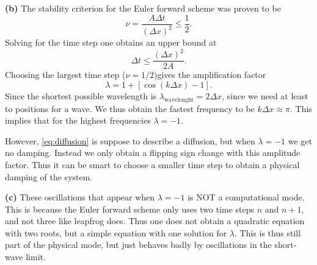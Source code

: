 \textbf{(b)}
The stability criterion for the Euler forward scheme was proven to be 
\begin{equation*}
    \nu = \frac{A \Delta t}{(\Delta x)^2} \le \frac{1}{2}.
\end{equation*}
Solving for the time step one obtains an upper bound at
\begin{equation*}
    \Delta t \leq \frac{(\Delta x)^2}{2A}.
\end{equation*}
Choosing the largest time step ($\nu=1/2$)gives the amplification factor 
\begin{equation*}
    \lambda = 1 + \left[\cos(k\Delta x) - 1\right].
\end{equation*}
Since the shortest possible wavelength is $\lambda_\text{wavelenght}=2\Delta x$, since we need at least to positions for a wave. We thus obtain the fastest frequency to be $k\Delta x\approx \pi$. This implies that for the highest frequencies $\lambda = -1$. 

However, \autoref{eq:diffusion} is suppose to describe a diffusion, but when $\lambda = -1$ we get no damping. Instead we only obtain a flipping sign change with this amplitude factor. Thus it can be smart to choose a smaller time step to obtain a physical damping of the system. 

\textbf{(c)} These oscillations that appear when $\lambda=-1$ is NOT a computational mode. This is because the Euler forward scheme only uses two time steps $n$ and $n+1$, and not three like leapfrog does. Thus one does not obtain a quadratic equation with two roots, but a simple equation with one solution for $\lambda$. This is thus still part of the physical mode, but just behaves badly by oscillations in the short-wave limit. 